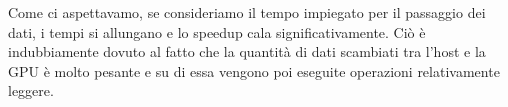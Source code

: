 Come ci aspettavamo, se consideriamo il tempo impiegato per il passaggio dei dati, i tempi si allungano e lo
speedup cala significativamente.
Ciò è indubbiamente dovuto al fatto che la quantità di dati scambiati tra l'host e la GPU è molto pesante e su di essa
vengono poi eseguite operazioni relativamente leggere.


